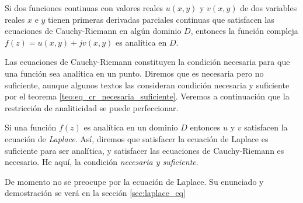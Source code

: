\begin{theorem}
  Si dos funciones continuas con valores reales $u(x,y)$ y $v(x,y)$ de dos variables reales $x$ e $y$ tienen primeras derivadas parciales continuas que satisfacen las ecuaciones de Cauchy-Riemann en algún dominio $D$, entonces la función compleja $f(z)=u(x,y)+jv(x,y)$ es analítica en $D$.
  \label{teo:eq_cr_necesaria_suficiente}
\end{theorem}

Las ecuaciones de Cauchy-Riemann constituyen la condición necesaria para que una función sea analítica en un punto. Diremos que es necesaria pero no suficiente, aunque algunos textos las consideran condición necesaria y suficiente por el teorema \ref{teo:eq_cr_necesaria_suficiente}. Veremos a continuación que la restricción de analiticidad se puede perfeccionar. 

Si una función $f(z)$ es analítica en un dominio $D$ entonces $u$ y $v$ satisfacen la ecuación de \textit{Laplace}. Así, diremos que satisfacer la ecuación de Laplace es suficiente para ser analítica, y satisfacer las ecuaciones de Cauchy-Riemann es necesario. He aquí, la condición \textit{necesaria y suficiente}. 

De momento no se preocupe por la ecuación de Laplace. Su enunciado y demostración se verá en la sección \ref{sec:laplace_eq}

